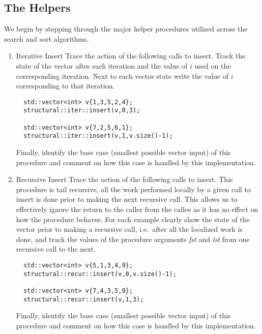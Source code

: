\documentclass[10pt]{article}
\begin{document}
\newpage \thispagestyle{empty}

\subsection*{The Helpers}

We begin by stepping through the major helper procedures utilized across the search and sort algorithms.
\begin{enumerate}
\item Iterative Insert \newline
Trace the action of the following calls to insert. Track the state of the vector after each iteration and the value of $i$ used on the corresponding iteration. Next to each vector state write the value of $i$ corresponding to that iteration.
\begin{lstlisting}
  std::vector<int> v{1,3,5,2,4};
  structural::iter::insert(v,0,3);

  std::vector<int> v{7,2,5,6,1};
  structural::iter::insert(v,1,v.size()-1);
\end{lstlisting}
Finally, identify the base case (smallest possible vector input) of this procedure and comment on how this case is handled by this implementation.

\newpage \thispagestyle{empty}
\hspace{1in}
\newpage \thispagestyle{empty}

\item Recursive Insert \newline
Trace the action of the following calls to insert. This procedure is tail recursive, all the work performed locally by a given call to insert is done prior to making the next recursive call. This allows us to effectively ignore the return to the caller from the callee as it has no effect on how the procedure behaves. For each example clearly show the state of the vector prior to making a recursive call, i.e.\ after all the localized work is done, and track the values of the procedure arguments \textit{fst} and \textit{lst} from one recursive call to the next.

\begin{lstlisting}
  std::vector<int> v{5,1,3,4,9};
  structural::recur::insert(v,0,v.size()-1);

  std::vector<int> v{7,4,3,5,9};
  structural::recur::insert(v,1,3);
\end{lstlisting}
Finally, identify the base case (smallest possible vector input) of this procedure and comment on how this case is handled by this implementation.


\end{enumerate}
\end{document}
